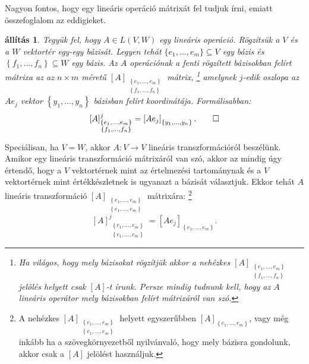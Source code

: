 \documentclass[9pt, showtrims]{memoir}
\theoremstyle{plain}
\newtheorem{proposition}{állítás}[section]
\theoremstyle{remark}
\theoremstyle{definition}
\begin{document}
Nagyon fontos, hogy egy lineáris operáció mátrixát fel tudjuk írni, emiatt összefoglalom az eddigieket.
\begin{proposition}
    Tegyük fel, hogy $A\in L\left( V,W \right)$ egy lineáris operáció.
    Rögzítsük a $V$ és a $W$ vektortér egy-egy bázisát.
    Legyen tehát $\{e_1,\dots,e_m\}\subseteq V$ egy bázis és
    $\left\{ f_1,\dots,f_n \right\}\subseteq W$ egy bázis.
    Az $A$ operációnak a fenti rögzített bázisokban felírt mátrixa az az
    $n\times m$ méretű 
    $[A]_{\substack{\left\{ e_1,\dots,e_m \right\}\\ \left\{ f_1,\dots,f_n \right\}}}$ 
    mátrix,
    \footnote{Ha világos, hogy mely bázisokat rögzítjük akkor a nehézkes
    $[A]_{\substack{\left\{ e_1,\dots,e_m \right\}\\ \left\{ f_1,\dots,f_n \right\}}}$
    jelölés helyett csak $[A]$-t írunk.
    Persze mindig tudnunk kell, hogy az $A$ lineáris operátor mely bázisokban felírt mátrixáról van szó.
    }
    amelynek $j$-edik oszlopa az $Ae_j$ vektor $\left\{ y_1,\dots,y_n \right\}$ bázisban felírt koordinátája.
    Formálisabban:
    \[
        [A]_{\substack{\left\{ e_1,\dots,e_m \right\}\\ \left\{ f_1,\dots,f_n \right\}}}^j
        =
        \left[ Ae_j \right]_{\left\{ y_1,\dots,y_n \right\}}.
        \qedhere
    \]
\end{proposition}
Speciálisan, ha $V=W$, akkor $A:V\to V$ lineáris transzformációról beszélünk.
Amikor egy lineáris transzformáció mátrixáról van szó, 
akkor az mindig úgy értendő, hogy a $V$ vektortérnek mint az értelmezési tartománynak és a
$V$ vektortérnek mint értékkészletnek is ugyanazt a bázisát választjuk.
Ekkor tehát $A$ lineáris transzformáció 
$[A]_{\substack{\left\{ e_1,\dots,e_m \right\}\\ \left\{ e_1,\dots,e_m \right\}}}$ 
mátrixára:
\footnote{
    A nehézkes 
    $[A]_{\substack{\left\{ e_1,\dots,e_m \right\}\\ \left\{ e_1,\dots,e_m \right\}}}$ 
    helyett egyszerűbben
    $[A]_{\left\{ e_1,\dots,e_m \right\}}$, vagy még inkább ha a szövegkörnyezetből nyilvánvaló, hogy mely bázisra gondolunk,
    akkor csak a $[A]$ jelölést használjuk.
}
\[
        [A]_{\substack{\left\{ e_1,\dots,e_m \right\}\\ \left\{ e_1,\dots,e_m \right\}}}^j
        =
        \left[ Ae_j \right]_{\left\{ e_1,\dots,e_m \right\}}.
\]
\end{document}
